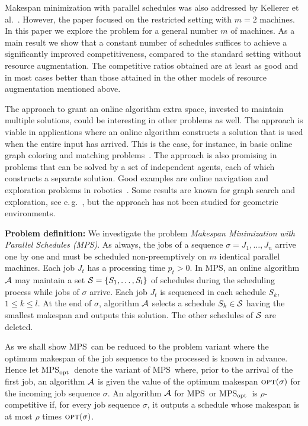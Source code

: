 \documentclass{llncs}
\newcommand{\OPT}{\text{{\sc opt}}}
\newcommand{\opt}{\OPT}
\newcommand{\MPS}{{\rm MPS}}
\newcommand{\MPSO}{{\rm MPS$_{\rm opt}$}}
\begin{document}
Makespan minimization with parallel schedules was also addressed by Kellerer et al.~\cite{KKST}. 
However, the paper focused on the restricted setting with  $m=2$ machines.
In this paper we explore the problem for a
general number $m$ of machines. As a main result we show that a constant number of schedules
suffices to achieve a significantly improved competitiveness, compared to the standard setting
without resource augmentation. The competitive ratios obtained are at least 
as good and in most cases better than those attained in the other models of resource augmentation 
mentioned above. 

The approach to grant an online algorithm extra space, invested to maintain multiple solutions,
could be interesting in other problems as well. The approach is viable in applications where an 
online algorithm constructs a solution that is used when the entire input has arrived.  
This is the case, for instance, in basic online graph coloring and matching problems~\cite{I,KVV,LST}. 
The approach is also promising in problems that can be solved by a set of independent agents, each of 
which constructs a separate solution. Good examples are online navigation and exploration problems
in robotics~\cite{BC,BRS,DKP}. Some results are known for graph search and 
exploration, see e.\,g.~\cite{BS,FGK,LS}, but the approach has not been studied for geometric 
environments.

\vspace*{0.1cm}

{\bf Problem definition:}
We investigate the problem {\em Makespan Minimization with Parallel Schedules (MPS)\/}. As always, the
jobs of a sequence $\sigma = J_1, \ldots, J_n$ arrive one by one and must be scheduled 
non-preemptively on $m$ identical parallel machines. Each job $J_t$ has a processing time $p_t >0$. 
In \MPS, an online algorithm ${\cal A}$ may maintain a set ${\cal S} = \{S_1, \ldots, S_l\}$ of schedules
during the scheduling process while jobs of $\sigma$ arrive. Each job $J_t$ is sequenced 
in each schedule $S_k$, $1\leq k \leq l$. At the end of $\sigma$, algorithm ${\cal A\/}$ selects a schedule 
$S_k\in {\cal S}$ having the smallest makespan and outputs this solution. The other schedules of ${\cal S\/}$
are deleted. 

As we shall show \MPS\ can be reduced to the problem variant where the optimum makespan of the job sequence
to the processed is known in advance. Hence let \MPSO\ denote the variant of \MPS\ where, prior to the
arrival of the first job, an algorithm ${\cal A\/}$ is given the value of the optimum makespan
$\opt(\sigma)$ for the incoming job sequence $\sigma$. 
An algorithm ${\cal A}$ for \MPS\ or \MPSO\ is 
$\rho$-competitive if, for every job sequence $\sigma$, it outputs a schedule whose makespan is at most 
$\rho$ times $\opt(\sigma)$.
\end{document}
